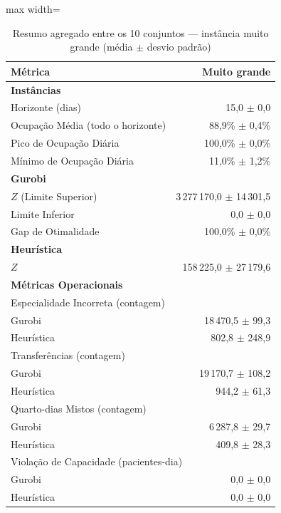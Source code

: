 \begin{table}[htbp]
    \caption{Resumo agregado entre os 10 conjuntos --- instância muito grande (média $\pm$ desvio padrão)}
    \label{tab:agregado-muito-grande}
    \centering
    \begin{adjustbox}{max width=\textwidth}
    \begin{tabular}{lr}
        \hline
        \textbf{Métrica} & \textbf{Muito grande} \\
        \hline
        \multicolumn{2}{l}{\textbf{Instâncias}} \\
        Horizonte (dias) & 15,0 $\pm$ 0,0 \\
        Ocupação Média (todo o horizonte) & 88,9\% $\pm$ 0,4\% \\
        Pico de Ocupação Diária & 100,0\% $\pm$ 0,0\% \\
        Mínimo de Ocupação Diária & 11,0\% $\pm$ 1,2\% \\
        \hline
        \multicolumn{2}{l}{\textbf{Gurobi}} \\
        $Z$ (Limite Superior) & 3\,277\,170,0 $\pm$ 14\,301,5 \\
        Limite Inferior & 0,0 $\pm$ 0,0 \\
        Gap de Otimalidade & 100,0\% $\pm$ 0,0\% \\
        \hline
        \multicolumn{2}{l}{\textbf{Heurística}} \\
        $Z$ & 158\,225,0 $\pm$ 27\,179,6 \\
        \hline
        \multicolumn{2}{l}{\textbf{Métricas Operacionais}} \\
        \multicolumn{2}{l}{Especialidade Incorreta (contagem)} \\
        \quad Gurobi & 18\,470,5 $\pm$ 99,3 \\
        \quad Heurística & 802,8 $\pm$ 248,9 \\
        \multicolumn{2}{l}{Transferências (contagem)} \\
        \quad Gurobi & 19\,170,7 $\pm$ 108,2 \\
        \quad Heurística & 944,2 $\pm$ 61,3 \\
        \multicolumn{2}{l}{Quarto-dias Mistos (contagem)} \\
        \quad Gurobi & 6\,287,8 $\pm$ 29,7 \\
        \quad Heurística & 409,8 $\pm$ 28,3 \\
        \multicolumn{2}{l}{Violação de Capacidade (pacientes-dia)} \\
        \quad Gurobi & 0,0 $\pm$ 0,0 \\
        \quad Heurística & 0,0 $\pm$ 0,0 \\
        \hline
    \end{tabular}
    \end{adjustbox}
\end{table}
